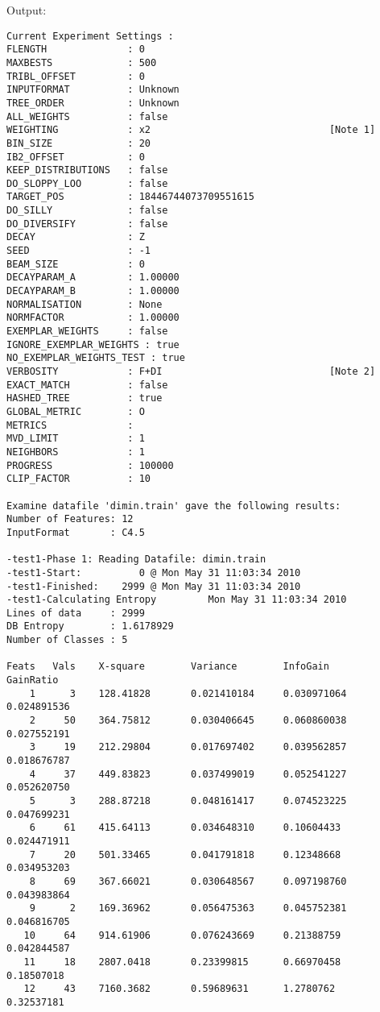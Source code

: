 \documentclass{report}
\begin{document}
Output:
\begin{footnotesize}
\begin{verbatim}
Current Experiment Settings :
FLENGTH              : 0
MAXBESTS             : 500
TRIBL_OFFSET         : 0
INPUTFORMAT          : Unknown
TREE_ORDER           : Unknown
ALL_WEIGHTS          : false
WEIGHTING            : x2                               [Note 1]
BIN_SIZE             : 20
IB2_OFFSET           : 0
KEEP_DISTRIBUTIONS   : false
DO_SLOPPY_LOO        : false
TARGET_POS           : 18446744073709551615
DO_SILLY             : false
DO_DIVERSIFY         : false
DECAY                : Z
SEED                 : -1
BEAM_SIZE            : 0
DECAYPARAM_A         : 1.00000
DECAYPARAM_B         : 1.00000
NORMALISATION        : None
NORMFACTOR           : 1.00000
EXEMPLAR_WEIGHTS     : false
IGNORE_EXEMPLAR_WEIGHTS : true
NO_EXEMPLAR_WEIGHTS_TEST : true
VERBOSITY            : F+DI                             [Note 2]
EXACT_MATCH          : false
HASHED_TREE          : true
GLOBAL_METRIC        : O
METRICS              : 
MVD_LIMIT            : 1
NEIGHBORS            : 1
PROGRESS             : 100000
CLIP_FACTOR          : 10

Examine datafile 'dimin.train' gave the following results:
Number of Features: 12
InputFormat       : C4.5

-test1-Phase 1: Reading Datafile: dimin.train
-test1-Start:          0 @ Mon May 31 11:03:34 2010
-test1-Finished:    2999 @ Mon May 31 11:03:34 2010
-test1-Calculating Entropy         Mon May 31 11:03:34 2010
Lines of data     : 2999
DB Entropy        : 1.6178929
Number of Classes : 5

Feats   Vals    X-square        Variance        InfoGain        GainRatio
    1      3    128.41828       0.021410184     0.030971064     0.024891536
    2     50    364.75812       0.030406645     0.060860038     0.027552191
    3     19    212.29804       0.017697402     0.039562857     0.018676787
    4     37    449.83823       0.037499019     0.052541227     0.052620750
    5      3    288.87218       0.048161417     0.074523225     0.047699231
    6     61    415.64113       0.034648310     0.10604433      0.024471911
    7     20    501.33465       0.041791818     0.12348668      0.034953203
    8     69    367.66021       0.030648567     0.097198760     0.043983864
    9      2    169.36962       0.056475363     0.045752381     0.046816705
   10     64    914.61906       0.076243669     0.21388759      0.042844587
   11     18    2807.0418       0.23399815      0.66970458      0.18507018
   12     43    7160.3682       0.59689631      1.2780762       0.32537181


\end{verbatim}
\end{footnotesize}
\end{document}
